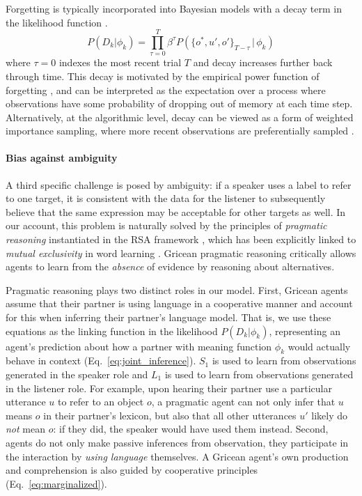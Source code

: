 Forgetting is typically incorporated into Bayesian models with a decay term in the likelihood function \cite{anderson2000adaptive,angela2009sequential,fudenberg2014recency,kalm2018visual}.
$$P(D_k | \phi_k) = \prod_{\tau=0}^T \beta^{\tau} P(\{o^*,u',o'\}_{T-\tau}\, |\, \phi_k)$$
where $\tau=0$ indexes the most recent trial $T$ and decay increases further back through time.
This decay is motivated by the empirical power function of forgetting \cite{wixted1991form}, and can be interpreted as the expectation over a process where observations have some probability of dropping out of memory at each time step.
Alternatively, at the algorithmic level, decay can be viewed as a form of weighted importance sampling, where more recent observations are preferentially sampled \cite{pearl2010online}.

\paragraph{Bias against ambiguity}

A third specific challenge is posed by ambiguity: if a speaker uses a label to refer to one target, it is consistent with the data for the listener to subsequently believe that the same expression may be acceptable for other targets as well. 
In our account, this problem is naturally solved by the principles of \textit{pragmatic reasoning} instantiated in the RSA framework \cite{Grice75_LogicConversation}, which has been explicitly linked to \emph{mutual exclusivity} in word learning \cite{bloom2002children,FrankGoodmanTenenbaum09_Wurwur,SmithGoodmanFrank13_RecursivePragmaticReasoningNIPS,gulordava2020one,ohmerreinforcement}.
Gricean pragmatic reasoning critically allows agents to learn from the \emph{absence} of evidence by reasoning about alternatives. 

Pragmatic reasoning plays two distinct roles in our model.
First, Gricean agents assume that their partner is using language in a cooperative manner and account for this when inferring their partner's language model.
That is, we use these equations as the linking function in the likelihood $P(D_k | \phi_k)$, representing an agent's prediction about how a partner with meaning function $\phi_k$ would actually behave in context (Eq.~\ref{eq:joint_inference}). 
$S_1$ is used to learn from observations generated in the speaker role and $L_1$ is used to learn from observations generated in the listener role.
For example, upon hearing their partner use a particular utterance $u$ to refer to an object $o$, a pragmatic agent can not only infer that $u$ means $o$ in their partner's lexicon, but also that all other utterances $u'$ likely do \emph{not} mean $o$: if they did, the speaker would have used them instead.
Second, agents do not only make passive inferences from observation, they participate in the interaction by \emph{using language} themselves.
A Gricean agent's own production and comprehension is also guided by cooperative principles (Eq.~\ref{eq:marginalized}).

